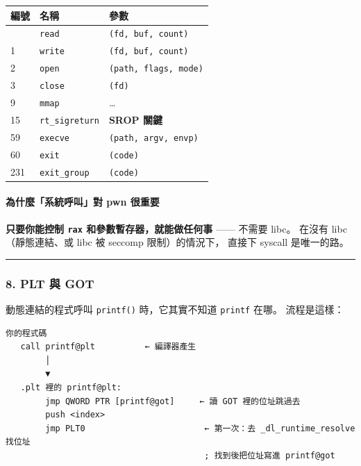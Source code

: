 \documentclass[10pt,a4paper]{article}
\newcounter{none}
\begin{document}
{\def\LTcaptype{none} %
\begin{longtable}[]{@{}lll@{}}
\toprule\noalign{}
編號 & 名稱 & 參數 \\
\midrule\noalign{}
\endhead
\bottomrule\noalign{}
\endlastfoot
0 & \texttt{read} & \texttt{(fd,\allowbreak{}\ \allowbreak{}buf,\allowbreak{}\ \allowbreak{}count)} \\
1 & \texttt{write} & \texttt{(fd,\allowbreak{}\ \allowbreak{}buf,\allowbreak{}\ \allowbreak{}count)} \\
2 & \texttt{open} & \texttt{(path,\allowbreak{}\ \allowbreak{}flags,\allowbreak{}\ \allowbreak{}mode)} \\
3 & \texttt{close} & \texttt{(fd)} \\
9 & \texttt{mmap} & \ldots{} \\
15 & \texttt{rt\_\allowbreak{}sigreturn} & \textbf{SROP 關鍵} \\
59 & \texttt{execve} & \texttt{(path,\allowbreak{}\ \allowbreak{}argv,\allowbreak{}\ \allowbreak{}envp)} \\
60 & \texttt{exit} & \texttt{(code)} \\
231 & \texttt{exit\_\allowbreak{}group} & \texttt{(code)} \\
\end{longtable}
}

\paragraph{為什麼「系統呼叫」對 pwn
很重要}\label{ux70baux4ec0ux9ebcux7cfbux7d71ux547cux53ebux5c0d-pwn-ux5f88ux91cdux8981}

\textbf{只要你能控制 \texttt{rax} 和參數暫存器，就能做任何事} ------
不需要 libc。 在沒有 libc（靜態連結、或 libc 被 seccomp 限制）的情況下，
直接下 syscall 是唯一的路。

\begin{center}\rule{0.5\linewidth}{0.5pt}\end{center}

\subsubsection{8. PLT 與 GOT}\label{plt-ux8207-got}

動態連結的程式呼叫 \texttt{printf()} 時，它其實不知道 \texttt{printf}
在哪。 流程是這樣：

\begin{Verbatim}[breaklines=true,breakanywhere=true,breakautoindent=false,fontsize=\fontsize{7.0}{9.5}\selectfont]
你的程式碼
   call printf@plt          ← 編譯器產生
        │
        ▼
   .plt 裡的 printf@plt:
        jmp QWORD PTR [printf@got]     ← 讀 GOT 裡的位址跳過去
        push <index>
        jmp PLT0                        ← 第一次：去 _dl_runtime_resolve 找位址
                                        ; 找到後把位址寫進 printf@got
\end{Verbatim}
\end{document}
